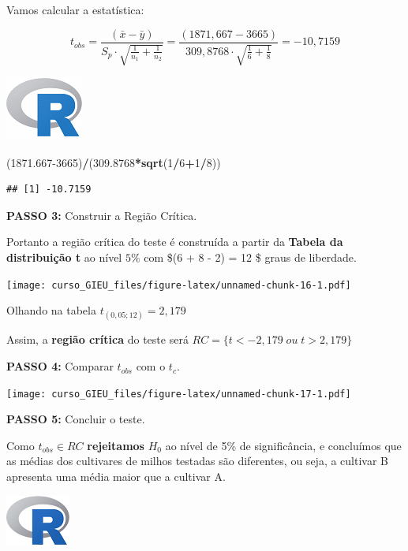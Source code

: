 \documentclass[
]{book}
\newenvironment{Shaded}{\begin{snugshade}}{\end{snugshade}}
\newcommand{\DecValTok}[1]{\textcolor[rgb]{0.00,0.00,0.81}{#1}}
\newcommand{\FloatTok}[1]{\textcolor[rgb]{0.00,0.00,0.81}{#1}}
\newcommand{\KeywordTok}[1]{\textcolor[rgb]{0.13,0.29,0.53}{\textbf{#1}}}
\newcommand{\NormalTok}[1]{#1}
\newcommand{\OperatorTok}[1]{\textcolor[rgb]{0.81,0.36,0.00}{\textbf{#1}}}
\begin{document}
Vamos calcular a estatística:

\[
t_{obs} = \frac{(\bar{x} - \bar{y})}{S_p \cdot \sqrt{\frac{1}{n_1} +\frac{1}{n_2}} }=\frac{(1871,667 - 3665)}{309,8768 \cdot \sqrt{\frac{1}{6} +\frac{1}{8}} } = -10,7159
\]

\includegraphics{R.png}

\begin{Shaded}
\begin{Highlighting}[]
\NormalTok{(}\FloatTok{1871.667}\DecValTok{-3665}\NormalTok{)}\OperatorTok{/}\NormalTok{(}\FloatTok{309.8768}\OperatorTok{*}\KeywordTok{sqrt}\NormalTok{(}\DecValTok{1}\OperatorTok{/}\DecValTok{6}\OperatorTok{+}\DecValTok{1}\OperatorTok{/}\DecValTok{8}\NormalTok{))}
\end{Highlighting}
\end{Shaded}

\begin{verbatim}
## [1] -10.7159
\end{verbatim}

\textbf{PASSO 3:} Construir a Região Crítica.

Portanto a região crítica do teste é construída a partir da \textbf{Tabela da distribuição t} ao nível \(5\%\) com \$(6 + 8 - 2) = 12 \$ graus de liberdade.

\texttt{[image: curso\_GIEU\_files/figure-latex/unnamed-chunk-16-1.pdf]}

Olhando na tabela \(t_{(0,05; 12)} = 2,179\)

Assim, a \textbf{região crítica} do teste será \(RC = \{t < -2,179 \;ou\;t>2,179\}\)

\textbf{PASSO 4:} Comparar \(t_{obs}\) com o \(t_c\).

\texttt{[image: curso\_GIEU\_files/figure-latex/unnamed-chunk-17-1.pdf]}

\textbf{PASSO 5:} Concluir o teste.

Como \(t_{obs} \in RC\) \textbf{rejeitamos } \(H_0\) ao nível de 5\% de significância, e concluímos que as médias dos cultivares de milhos testadas são diferentes, ou seja, a cultivar B apresenta uma média maior que a cultivar A.

\includegraphics{Rlogo.png}
\end{document}
